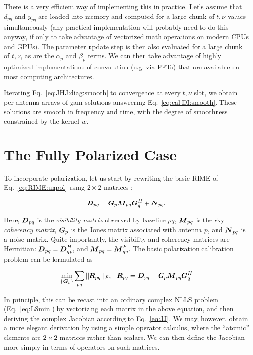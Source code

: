 \documentclass[useAMS,usenatbib]{mn2e}
\newcommand{\mat}[1]{{\bmath{#1}}}
\newcommand{\DD}{\mat{D}}
\newcommand{\MM}{\mat{M}}
\newcommand{\RR}{\mat{R}}
\newcommand{\GG}{\mat{G}}
\begin{document}
There is a very efficient way of implementing this in practice. Let's assume that $d_{pq}$ and $y_{pq}$ are loaded into memory 
and computed for a large chunk of $t,\nu$ values simultaneously (any practical implementation will probably need to do this anyway, 
if only to take advantage of vectorized math operations on modern CPUs and GPUs). The parameter update step is then also evaluated
for a large chunk of $t,\nu$, as are the $\alpha_p$ and $\beta_p$ terms. We can then take advantage of highly optimized 
implementations of convolution (e.g. via FFTs) that are available on most computing architectures. 

Iterating Eq.~\ref{eq:JHJ:diag:smooth} to convergence at every $t,\nu$ slot, we obtain per-antenna arrays of gain solutions 
answrering Eq.~\ref{eq:cal:DI:smooth}. These solutions are smooth in frequency and time, with the degree of smoothness 
constrained by the kernel $w$. 

\section{The Fully Polarized Case}
\label{sec:pol}

To incorporate polarization, let us start by rewriting the basic RIME of Eq.~\ref{eq:RIME:unpol} using $2\times 2$ matrices \citep[a full derivation
may be found in][]{RRIME1}:

\begin{equation}
\label{eq:RIME:pol}
\DD_{pq} = \GG_p \MM_{pq} \GG^H_q + \mat{N}_{pq}.
\end{equation}

Here, $\DD_{pq}$ is the \emph{visibility matrix} observed by baseline $pq$, $\MM_{pq}$ is the sky \emph{coherency matrix}, $\GG_p$ is the Jones matrix associated with antenna $p$, and $\mat{N}_{pq}$ is a noise matrix. Quite importantly, the visibility and coherency matrices are Hermitian: 
$\DD_{pq}=\DD^H_{qp}$, and $\MM_{pq}=\MM^H_{qp}$. The basic polarization calibration problem can be formulated as

\begin{equation}
\label{eq:cal:DI:pol}
\min_{\{\GG_p\}}\sum_{pq}||\RR_{pq}||_F,~~
\RR_{pq} = \DD_{pq}-\GG_p \MM_{pq} \GG^H_q
\end{equation}



In principle, this can be recast into an ordinary complex NLLS problem (Eq.~\ref{eq:LSmin}) by vectorizing each 
matrix in the above equation,  and then deriving the complex Jacobian according to Eq.~\ref{eq:JJ}. We may, however, 
obtain a more elegant derivation by using a simple operator calculus, where the ``atomic'' elements are $2\times2$ matrices 
rather than scalars. We can then define the Jacobian more simply in terms of operators on such matrices. 
\end{document}
